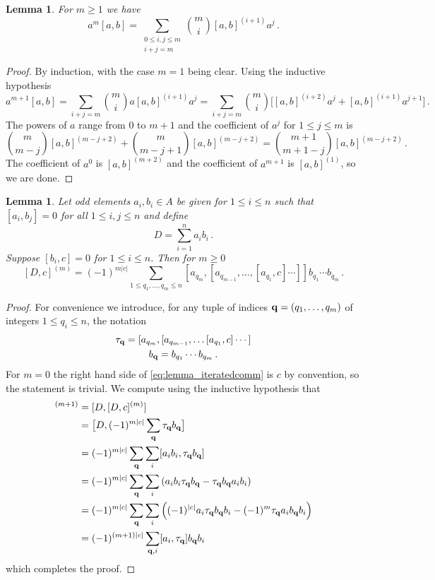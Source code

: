 \documentclass[english,letter paper,12pt,leqno]{article}
\newtheorem{lemma}[theorem]{Lemma}
\theoremstyle{example}
\numberwithin{equation}{section}
\def\be{\begin{equation}}
\def\ee{\end{equation}}
\begin{document}
\begin{lemma}\label{lemma:woop4} For $m \ge 1$ we have
\be
a^m [a, b] = \sum_{\substack{0 \le i,j \le m \\ i+j=m}} \binom{m}{i} [a,b]^{(i+1)} a^j\,.
\ee
\end{lemma}
\begin{proof}
By induction, with the case $m = 1$ being clear. Using the inductive hypothesis
\[
a^{m+1} [a, b] = \sum_{i+j=m} \binom{m}{i} a [a,b]^{(i+1)} a^j = \sum_{i+j=m} \binom{m}{i} \Big[ [a,b]^{(i+2)} a^j + [a,b]^{(i+1)} a^{j+1} \Big]\,.
\]
The powers of $a$ range from $0$ to $m+1$ and the coefficient of $a^j$ for $1 \le j \le m$ is
\[
\binom{m}{m-j} [a,b]^{(m-j+2)} + \binom{m}{m-j+1} [a,b]^{(m-j+2)} = \binom{m+1}{m+1-j} [a,b]^{(m-j+2)}\,.
\]
The coefficient of $a^0$ is $[a,b]^{(m+2)}$ and the coefficient of $a^{m+1}$ is $[a,b]^{(1)}$, so we are done.
\end{proof}

\begin{lemma}\label{lemma_iteratedcomm} Let odd elements $a_i, b_i \in A$ be given for $1 \le i \le n$ such that $[a_i, b_j] = 0$ for all $1 \le i,j \le n$ and define
\[
D = \sum_{i=1}^n a_i b_i\,.
\]
Suppose $[b_i,c] = 0$ for $1 \le i \le n$. Then for $m \ge 0$
\be\label{eq:lemma_iteratedcomm}
[D, c]^{(m)} = (-1)^{m|c|} \sum_{1 \le q_1,\ldots,q_m \le n} [a_{q_m}, [a_{q_{m-1}}, \ldots, [ a_{q_1}, c] \cdots ]] b_{q_1} \cdots b_{q_m}\,.
\ee
\end{lemma}
\begin{proof}
For convenience we introduce, for any tuple of indices $\bold{q} = (q_1,\ldots,q_m)$ of integers $1 \le q_i \le n$, the notation
\begin{gather}
\tau_{\bold{q}} = [ a_{q_m}, [ a_{q_{m-1}}, \ldots [ a_{q_1}, c ] \cdots ] \label{defn:tau}\\
b_{\bold{q}} = b_{q_1} \cdots b_{q_m} \label{defn:bq}\,.
\end{gather}
For $m = 0$ the right hand side of \eqref{eq:lemma_iteratedcomm} is $c$ by convention, so the statement is trivial. We compute using the inductive hypothesis that
\begin{align*}
[D, c]^{(m+1)} &= [ D, [D, c]^{(m)} ]\\
&= \big[D, (-1)^{m|c|} \sum_{\bold{q}} \tau_{\bold{q}} b_{\bold{q}}\big]\\
&= (-1)^{m|c|} \sum_{\bold{q}} \sum_i [ a_i b_i , \tau_{\bold{q}} b_{\bold{q}}]\\
&= (-1)^{m|c|} \sum_{\bold{q}} \sum_i \left( a_i b_i \tau_{\bold{q}} b_{\bold{q}} - \tau_{\bold{q}} b_{\bold{q}} a_i b_i \right)\\
&= (-1)^{m|c|} \sum_{\bold{q}} \sum_i \left( (-1)^{|c|} a_i \tau_{\bold{q}} b_{\bold{q}} b_i - (-1)^m \tau_{\bold{q}} a_i b_{\bold{q}} b_i \right)\\
&= (-1)^{(m+1)|c|} \sum_{\bold{q}, i} [ a_i, \tau_{\bold{q}} ] b_{\bold{q}} b_i
\end{align*}
which completes the proof.
\end{proof}
\end{document}
